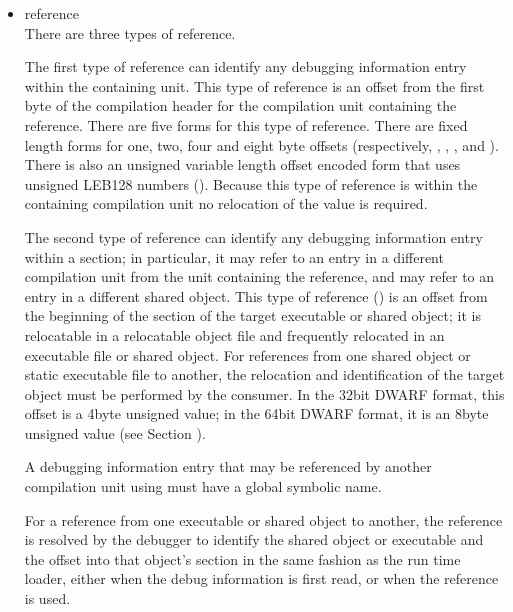 \begin{itemize}
\item reference \\
There are three types of reference.

The first type of reference can identify any debugging
information entry within the containing unit. This type of
reference is an offset from the first byte of the compilation
header for the compilation unit containing the reference. There
are five forms for this type of reference. There are fixed
length forms for one, two, four and eight byte offsets
(respectively, , 
, 
,
and ). 
There is also an unsigned variable
length offset encoded form that uses unsigned LEB128 numbers
(). 
Because this type of reference is within
the containing compilation unit no relocation of the value
is required.

The second type of reference can identify any debugging
information entry within a 
 section; in particular,
it may refer to an entry in a different compilation unit
from the unit containing the reference, and may refer to an
entry in a different shared object.  This type of reference
() is an offset from the beginning of the
section of the target executable or shared object;
it is relocatable in a relocatable object file and frequently
relocated in an executable file or shared object. For
references from one shared object or static executable file
to another, the relocation and identification of the target
object must be performed by the consumer. In the 32\dash bit DWARF
format, this offset is a 4\dash byte unsigned value; 
in the 64\dash bit DWARF format, it is an 8\dash byte
unsigned value 
(see Section ).

A debugging information entry that may be referenced by
another compilation unit using  must have a
global symbolic name.

For a reference from one executable or shared object to
another, the reference is resolved by the debugger to identify
the shared object or executable and the offset into that
object’s 
section in the same fashion as the run
time loader, either when the debug information is first read,
or when the reference is used.


\end{itemize}

